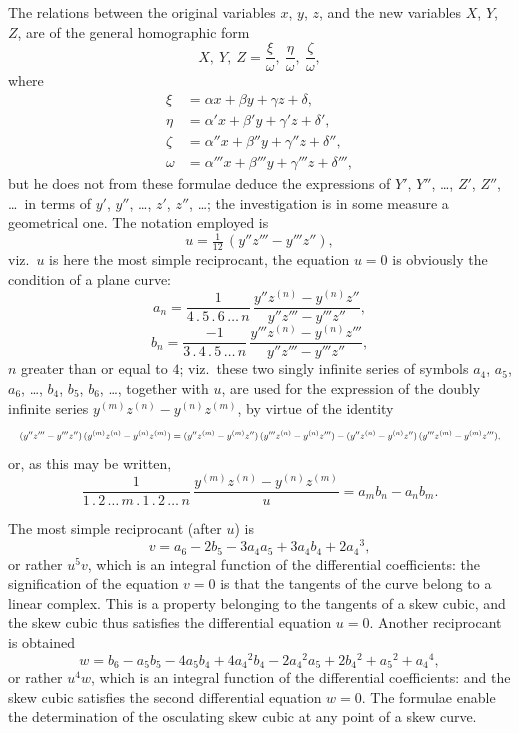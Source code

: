 \documentclass[11pt]{article}
\begin{document}
The relations between the original variables $x$, $y$, $z$, and the new variables $X$, $Y$, $Z$, are of the general homographic form
\[
X,\ Y,\ Z = \frac{\xi}{\omega},\ \frac{\eta}{\omega},\ \frac{\zeta}{\omega},
\]
where
\[
\begin{aligned}
\xi &= \alpha x + \beta y + \gamma z + \delta, \\
\eta &= \alpha' x + \beta' y + \gamma' z + \delta', \\
\zeta &= \alpha'' x + \beta'' y + \gamma'' z + \delta'', \\
\omega &= \alpha''' x + \beta''' y + \gamma''' z + \delta''',
\end{aligned}
\]
but he does not from these formulae deduce the expressions of $Y'$, $Y''$, \ldots, $Z'$, $Z''$, \ldots\ in terms of $y'$, $y''$, \ldots, $z'$, $z''$, \ldots; the investigation is in some measure a geometrical one. The notation employed is
\[
u = \tfrac{1}{12}\,(y'' z''' - y''' z''),
\]
viz.\ $u$ is here the most simple reciprocant, the equation $u = 0$ is obviously the condition of a plane curve:
\[
a_n = \frac{1}{4\,.\,5\,.\,6\,\ldots\,n}\,\frac{y'' z^{(n)} - y^{(n)} z''}{y'' z''' - y''' z''},
\]
\[
b_n = \frac{-1}{3\,.\,4\,.\,5\,\ldots\,n}\,\frac{y'''z^{(n)} - y^{(n)} z'''}{y'' z''' - y''' z''},
\]
$n$ greater than or equal to $4$; viz.\ these two singly infinite series of symbols $a_4$, $a_5$, $a_6$, \ldots, $b_4$, $b_5$, $b_6$, \ldots, together with $u$, are used for the expression of the doubly infinite series $y^{(m)} z^{(n)} - y^{(n)} z^{(m)}$, by virtue of the identity
\[ \resizebox{\textwidth}{!}{$\displaystyle
(y'' z''' - y''' z'')\,(y^{(m)} z^{(n)} - y^{(n)} z^{(m)}) = (y'' z^{(m)} - y^{(m)} z'')\,(y''' z^{(n)} - y^{(n)} z''') - (y'' z^{(n)} - y^{(n)} z'')\,(y''' z^{(m)} - y^{(m)} z'''),
$} \]
or, as this may be written,
\[
\frac{1}{1\,.\,2\,\ldots\,m\,.\,1\,.\,2\,\ldots\,n}\,\frac{y^{(m)} z^{(n)} - y^{(n)} z^{(m)}}{u} = a_m b_n - a_n b_m.
\]

The most simple reciprocant (after $u$) is
\[
v = a_6 - 2 b_5 - 3 a_4 a_5 + 3 a_4 b_4 + 2 a_4{}^3,
\]
or rather $u^5 v$, which is an integral function of the differential coefficients: the signification of the equation $v = 0$ is that the tangents of the curve belong to a linear complex. This is a property belonging to the tangents of a skew cubic, and the skew cubic thus satisfies the differential equation $u = 0$. Another reciprocant is obtained
\[
w = b_6 - a_5 b_5 - 4 a_5 b_4 + 4 a_4{}^2 b_4 - 2 a_4{}^2 a_5 + 2 b_4{}^2 + a_5{}^2 + a_4{}^4,
\]
or rather $u^4 w$, which is an integral function of the differential coefficients: and the skew cubic satisfies the second differential equation $w = 0$. The formulae enable the determination of the osculating skew cubic at any point of a skew curve.
\end{document}

